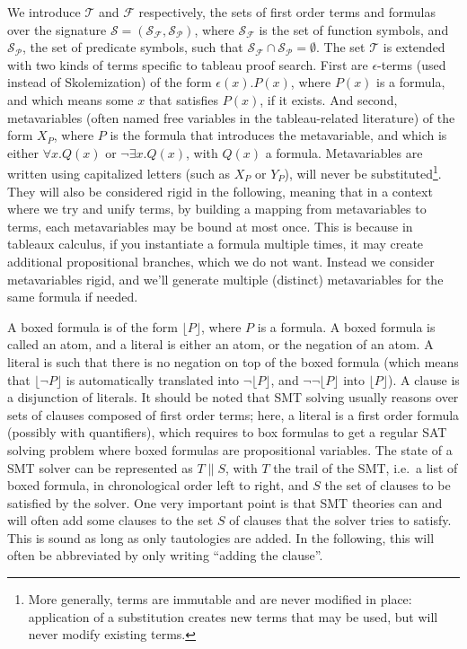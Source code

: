 We introduce $\mathcal{T}$ and $\mathcal{F}$ respectively, the sets of first
order terms and formulas over the signature
$\mathcal{S}=(\mathcal{S}_\mathcal{F},\mathcal{S}_\mathcal{P})$, where
$\mathcal{S}_\mathcal{F}$ is the set of function symbols, and
$\mathcal{S}_\mathcal{P}$, the set of predicate symbols, such that
$\mathcal{S}_\mathcal{F}\cap\mathcal{S}_\mathcal{P}=\emptyset$. The set
$\mathcal{T}$ is extended with two kinds of terms specific to tableau proof
search. First are $\epsilon{}$-terms (used instead of Skolemization) of the form
$\epsilon(x).P(x)$, where $P(x)$ is a formula, and which means some $x$ that
satisfies $P(x)$, if it exists. And second, metavariables (often named free
variables in the tableau-related literature) of the form $X_P$, where $P$ is the
formula that introduces the metavariable, and which is either $\forall{}x.Q(x)$
or $\neg\exists{}x.Q(x)$, with $Q(x)$ a formula. Metavariables are written using
capitalized letters (such as $X_P$ or $Y_P$), will never be
substituted\footnote{More generally, terms are immutable and are never modified
in place: application of a substitution creates new terms that may be used,
but will never modify existing terms.}. They will also be considered rigid in
the following, meaning that in a context where we try and unify terms, by building
a mapping from metavariables to terms, each metavariables may be bound at most
once.  This is because in tableaux calculus, if you instantiate a formula
multiple times, it may create additional propositional branches, which we do not
want. Instead we consider metavariables rigid, and we'll generate multiple
(distinct) metavariables for the same formula if needed.

A boxed formula is of the form $\lfloor{}P\rfloor$, where $P$ is a formula. A
boxed formula is called an atom, and a literal is either an atom, or the
negation of an atom. A literal is such that there is no negation on top of the
boxed formula (which means that $\lfloor\neg{}P\rfloor$ is automatically
translated into $\neg\lfloor{}P\rfloor$, and $\neg\neg\lfloor{}P\rfloor$ into
$\lfloor{}P\rfloor$).  A clause is a disjunction of literals. It should be noted
that SMT solving usually reasons over sets of clauses composed of first order
terms; here, a literal is a first order formula (possibly with quantifiers),
which requires to box formulas to get a regular SAT solving problem where boxed
formulas are propositional variables.  The state of a SMT solver can be
represented as $T \parallel S$, with $T$ the trail of the SMT, i.e.~a list of
boxed formula, in chronological order left to right, and $S$ the set of clauses
to be satisfied by the solver. One very important point is that SMT theories can
and will often add some clauses to the set $S$ of clauses that the solver tries
to satisfy. This is sound as long as only tautologies are added. In the
following, this will often be abbreviated by only writing ``adding the clause''.

